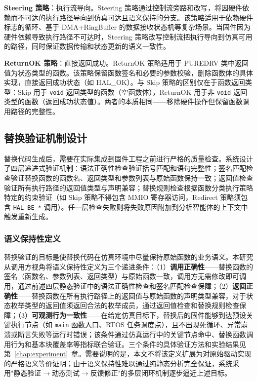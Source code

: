 \textbf{Steering 策略}：执行流导向。Steering 策略通过控制流旁路和改写，将因硬件依赖而不可达的执行路径导向到仿真可达且语义保持的分支。该策略适用于依赖硬件标志的循环、基于 DMA+RingBuffer 的数据接收状态机等复杂场景。当固件因为硬件依赖导致执行路径不可达时，Steering 策略改写控制流把执行导向到仿真可用的路径，同时保证数据传输和状态更新的语义一致性。

\textbf{ReturnOK 策略}：直接返回成功。ReturnOK 策略适用于 PUREDRV 类中返回值为状态类型的函数。该策略保留函数签名和必要的参数校验，删除函数体的具体实现，直接返回成功状态（如 HAL\_OK）。与 Skip 策略的区别仅在于函数返回类型：Skip 用于 \texttt{void} 返回类型的函数（空函数体），ReturnOK 用于非 \texttt{void} 返回类型的函数（返回成功状态值）。两者的本质相同——移除硬件操作但保留函数调用路径的完整性。



\subsection{替换验证机制设计}

替换代码生成后，需要在实际集成到固件工程之前进行严格的质量检查。系统设计了四层递进式验证机制：语法正确性检查验证括号匹配和语句完整性；签名匹配检查验证替换函数的函数名、返回类型和参数列表与原始函数保持一致；返回值检查验证所有执行路径的返回值类型与声明兼容；替换规则检查根据函数分类执行策略特定的约束验证（如 Skip 策略不得包含 MMIO 寄存器访问，Redirect 策略须包含 \texttt{HAL\_BE\_*} 调用）。任一层检查失败则将失败原因附加到分析智能体的上下文中触发重新生成。

\subsubsection{语义保持性定义}

替换验证的目标是使替换代码在仿真环境中尽量保持原始函数的业务语义。本研究从调用方视角将语义保持性定义为三个递进条件：（1）\textbf{调用正确性}——替换函数的签名（函数名、参数列表、返回类型）与原始函数一致，调用方无需修改即可调用，通过前述四层静态验证中的语法正确性检查和签名匹配检查保障；（2）\textbf{返回正确性}——替换函数在所有执行路径上的返回值与原始函数的声明类型兼容，对于状态枚举类型的返回值须返回合法的枚举成员，通过返回值检查和替换规则检查保障；（3）\textbf{可观测行为一致性}——在给定仿真目标下，替换后的固件能够到达预设关键执行节点（如 \texttt{main} 函数入口、RTOS 任务调度点），且不出现死循环、异常崩溃或断言失败等运行时错误；该条件通过仿真运行中的关键节点命中、替换函数调用行为和基本块覆盖率等指标联合验证。三个条件的具体验证方法和实验结果见第~\ref{chap:experiment}~章。需要说明的是，本文不将该定义扩展为对原始驱动实现的严格语义等价证明；由于语义保持性难以通过纯静态分析完全保证，系统采用"静态验证$\to$动态测试$\to$反馈修正"的多层闭环机制逐步逼近上述目标。

